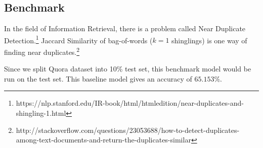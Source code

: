 \documentclass{article}
\begin{document}
\subsection{Benchmark}

In the field of Information Retrieval, there is a problem called Near Duplicate Detection.\footnote{https://nlp.stanford.edu/IR-book/html/htmledition/near-duplicates-and-shingling-1.html} Jaccard Similarity of bag-of-words ($k=1$ shinglings) is one way of finding near duplicates.\footnote{http://stackoverflow.com/questions/23053688/how-to-detect-duplicates-among-text-documents-and-return-the-duplicates-similar}

Since we split Quora dataset into 10\% test set, this benchmark model would be run on the test set. This baseline model gives an accuracy of $65.153\%$.
\end{document}
